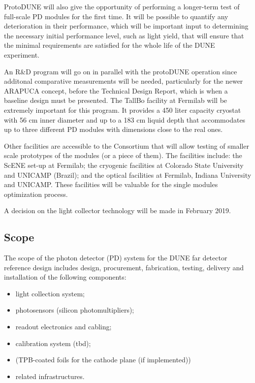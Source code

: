 ProtoDUNE will also give the opportunity of performing a longer-term test of full-scale PD modules for the first time. It will be possible to quantify any deterioration in their performance, which will be important input to determining the necessary initial performance level, such as light yield, that will ensure that the minimal requirements are satisfied for the whole life of the DUNE experiment.

An R\&D program will go on in parallel with the protoDUNE operation since 
additonal comparative measurements will be needed, particularly for the newer ARAPUCA concept, before the Technical Design 
Report, which is when a baseline design must be presented.
The TallBo facility at Fermilab will be extremely important for this program. 
It provides a 450 liter capacity cryostat with 56 cm inner diameter and up 
to a 183 cm liquid depth that accommodates  up to three different PD 
modules with dimensions  close to the real ones.

Other facilities are accessible to the Consortium that will allow testing of
smaller scale prototypes of the modules (or a piece of them). The facilities include: the 
ScENE set-up at Fermilab; the cryogenic facilities at Colorado State 
University and UNICAMP (Brazil); and the optical facilities at Fermilab, 
Indiana University and UNICAMP. These facilities will be valuable for the 
single modules optimization process.

A decision on the light collector technology will be made in February 2019.

\subsection{Scope}
\label{sec:fdsp-pd-scope}
The scope of the photon detector (PD) system for the DUNE far detector 
reference design includes design, procurement, fabrication, testing,
 delivery and installation of the following components:
\begin{itemize}
        \item light collection system;
        \item photosensors (silicon photomultipliers);
        \item readout electronics and cabling;
        \item calibration system (tbd);
        \item (TPB-coated foils for the cathode plane (if implemented))
        \item related infrastructures.
\end{itemize}
